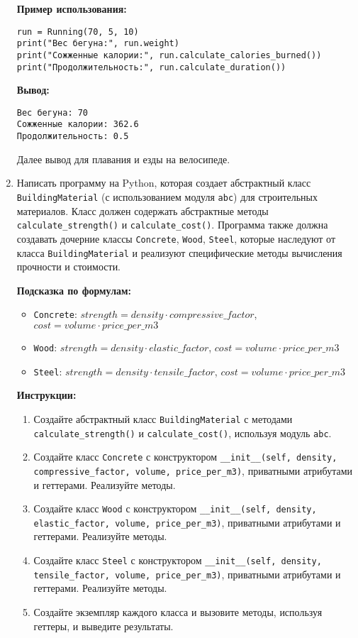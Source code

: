 \begin{enumerate}
\textbf{Пример использования:}
\begin{verbatim}
run = Running(70, 5, 10)
print("Вес бегуна:", run.weight)
print("Сожженные калории:", run.calculate_calories_burned())
print("Продолжительность:", run.calculate_duration())
\end{verbatim}

\textbf{Вывод:}
\begin{verbatim}
Вес бегуна: 70
Сожженные калории: 362.6
Продолжительность: 0.5
\end{verbatim}

Далее вывод для плавания и езды на велосипеде.

\item
Написать программу на Python, которая создает абстрактный класс \texttt{BuildingMaterial} (с использованием модуля \texttt{abc}) для строительных материалов. 
Класс должен содержать абстрактные методы \texttt{calculate\_strength()} и \texttt{calculate\_cost()}. 
Программа также должна создавать дочерние классы \texttt{Concrete}, \texttt{Wood}, \texttt{Steel}, 
которые наследуют от класса \texttt{BuildingMaterial} и реализуют специфические методы вычисления прочности и стоимости.

\textbf{Подсказка по формулам:}
\begin{itemize}
    \item \texttt{Concrete}: $strength = density \cdot compressive\_factor$, $cost = volume \cdot price\_per\_m3$
    \item \texttt{Wood}: $strength = density \cdot elastic\_factor$, $cost = volume \cdot price\_per\_m3$
    \item \texttt{Steel}: $strength = density \cdot tensile\_factor$, $cost = volume \cdot price\_per\_m3$
\end{itemize}

\textbf{Инструкции:}
\begin{enumerate}
    \item Создайте абстрактный класс \texttt{BuildingMaterial} с методами \texttt{calculate\_strength()} и \texttt{calculate\_cost()}, используя модуль \texttt{abc}.
    \item Создайте класс \texttt{Concrete} с конструктором \texttt{\_\_init\_\_(self, density, compressive\_factor, volume, price\_per\_m3)}, приватными атрибутами и геттерами. Реализуйте методы.
    \item Создайте класс \texttt{Wood} с конструктором \texttt{\_\_init\_\_(self, density, elastic\_factor, volume, price\_per\_m3)}, приватными атрибутами и геттерами. Реализуйте методы.
    \item Создайте класс \texttt{Steel} с конструктором \texttt{\_\_init\_\_(self, density, tensile\_factor, volume, price\_per\_m3)}, приватными атрибутами и геттерами. Реализуйте методы.
    \item Создайте экземпляр каждого класса и вызовите методы, используя геттеры, и выведите результаты.
\end{enumerate}


\end{enumerate}
